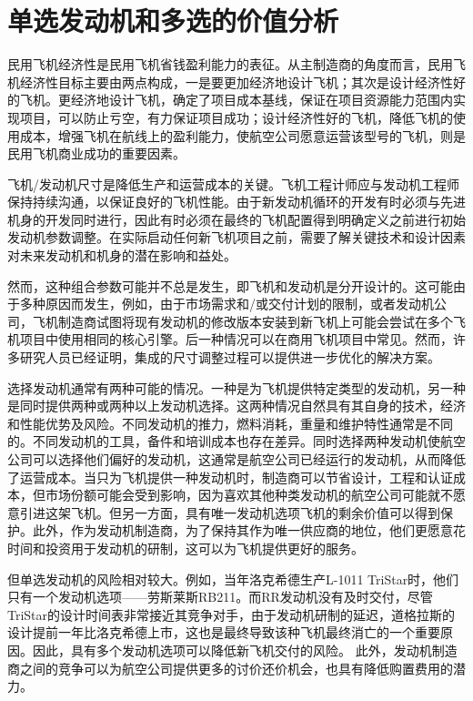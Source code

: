 \documentclass[12pt,a4paper]{report}
\begin{document}
\section{单选发动机和多选的价值分析}

民用飞机经济性是民用飞机省钱盈利能力的表征。从主制造商的角度而言，民用飞机经济性目标主要由两点构成，一是要更加经济地设计飞机；其次是设计经济性好的飞机。更经济地设计飞机，确定了项目成本基线，保证在项目资源能力范围内实现项目，可以防止亏空，有力保证项目成功；设计经济性好的飞机，降低飞机的使用成本，增强飞机在航线上的盈利能力，使航空公司愿意运营该型号的飞机，则是民用飞机商业成功的重要因素。

飞机/发动机尺寸是降低生产和运营成本的关键。飞机工程计师应与发动机工程师保持持续沟通，以保证良好的飞机性能。由于新发动机循环的开发有时必须与先进机身的开发同时进行，因此有时必须在最终的飞机配置得到明确定义之前进行初始发动机参数调整。在实际启动任何新飞机项目之前，需要了解关键技术和设计因素对未来发动机和机身的潜在影响和益处。

然而，这种组合参数可能并不总是发生，即飞机和发动机是分开设计的。这可能由于多种原因而发生，例如，由于市场需求和/或交付计划的限制，或者发动机公司，飞机制造商试图将现有发动机的修改版本安装到新飞机上可能会尝试在多个飞机项目中使用相同的核心引擎。后一种情况可以在商用飞机项目中常见。然而，许多研究人员已经证明，集成的尺寸调整过程可以提供进一步优化的解决方案。

选择发动机通常有两种可能的情况。一种是为飞机提供特定类型的发动机，另一种是同时提供两种或两种以上发动机选择。这两种情况自然具有其自身的技术，经济和性能优势及风险。不同发动机的推力，燃料消耗，重量和维护特性通常是不同的。不同发动机的工具，备件和培训成本也存在差异。同时选择两种发动机使航空公司可以选择他们偏好的发动机，这通常是航空公司已经运行的发动机，从而降低了运营成本。当只为飞机提供一种发动机时，制造商可以节省设计，工程和认证成本，但市场份额可能会受到影响，因为喜欢其他种类发动机的航空公司可能就不愿意引进这架飞机。但另一方面，具有唯一发动机选项飞机的剩余价值可以得到保护。此外，作为发动机制造商，为了保持其作为唯一供应商的地位，他们更愿意花时间和投资用于发动机的研制，这可以为飞机提供更好的服务。

但单选发动机的风险相对较大。例如，当年洛克希德生产L-1011 TriStar时，他们只有一个发动机选项——劳斯莱斯RB211。而RR发动机没有及时交付，尽管TriStar的设计时间表非常接近其竞争对手，由于发动机研制的延迟，道格拉斯的设计提前一年比洛克希德上市，这也是最终导致该种飞机最终消亡的一个重要原因。因此，具有多个发动机选项可以降低新飞机交付的风险。 此外，发动机制造商之间的竞争可以为航空公司提供更多的讨价还价机会，也具有降低购置费用的潜力。
\end{document}
